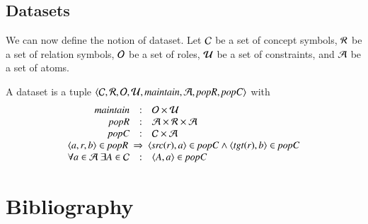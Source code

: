 \documentclass{elsarticle}
\begin{document}
\subsection{Datasets}
	We can now define the notion of dataset.
	Let
	$\mathcal{C}$ be a set of concept symbols,
	$\mathcal{R}$ be a set of relation symbols,
	$\mathcal{O}$ be a set of roles,
	$\mathcal{U}$ be a set of constraints, and
	$\mathcal{A}$ be a set of atoms.
\begin{definition}[dataset]
	\label{def:dataset}
	\item A dataset is a tuple $\langle\mathcal{C},\mathcal{R},\mathcal{O},\mathcal{U},\text{\it maintain\/},\mathcal{A},\text{\it popR\/},\text{\it popC\/}\rangle$ with
	\[\begin{array}[3]{rcl}
		\id{maintain}&:&\roles\times\rules\\
		\id{popR}&:&\atoms\times\rels\times\atoms\\
		\id{popC}&:&\concepts\times\atoms\\
		\multicolumn{3}{l}{\triple{a}{r}{b}\in\popR\ \Rightarrow\ \pair{\src{r}}{a}\in\popC \wedge \pair{\tgt{r}}{b}\in\popC}\\
		\forall a\in\atoms\ \exists A\in\concepts&:&\pair{A}{a}\in\popC
	\end{array}\]
\end{definition}


\section{Bibliography}


\end{document}
